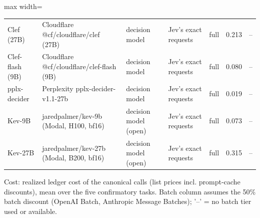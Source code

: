 \begin{table}[t]
\begin{adjustbox}{max width=\linewidth}
\begin{tabular}{lllllrr}
Clef (27B) & Cloudflare @cf/cloudflare/clef (27B) & decision model & Jev's exact requests & full & 0.213 & -- \\
Clef-flash (9B) & Cloudflare @cf/cloudflare/clef-flash (9B) & decision model & Jev's exact requests & full & 0.080 & -- \\
pplx-decider & Perplexity pplx-decider-v1.1-27b & decision model & Jev's exact requests & full & 0.019 & -- \\
Kev-9B & jaredpalmer/kev-9b (Modal, H100, bf16) & decision model (open) & Jev's exact requests & full & 0.073 & -- \\
Kev-27B & jaredpalmer/kev-27b (Modal, B200, bf16) & decision model (open) & Jev's exact requests & full & 0.315 & -- \\
\bottomrule
\end{tabular}
\end{adjustbox}
\par\smallskip\footnotesize\raggedright Cost: realized ledger cost of the canonical calls (list prices incl. prompt-cache discounts), mean over the five confirmatory tasks. Batch column assumes the 50\% batch discount (OpenAI Batch, Anthropic Message Batches); '--' = no batch tier used or available.
\end{table}
